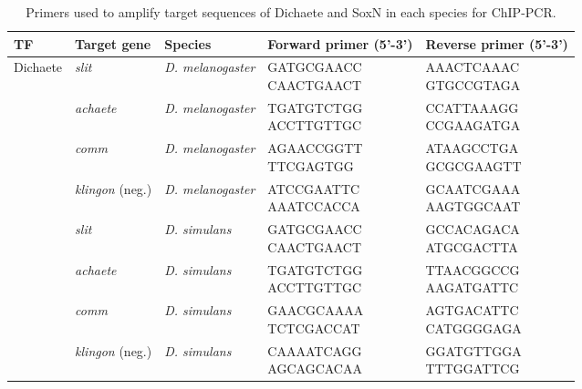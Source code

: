 \begin{center}
\begin{longtable}{|l|l|p{2.2cm}|p{3.3cm}|p{3.2cm}|}
\hline
\textbf{TF}       & \textbf{Target gene} & \textbf{Species}          & \textbf{Forward primer (5'-3')}       & \textbf{Reverse primer (5'-3')}       \\ \hline
\endfirsthead

\caption{Primers used to amplify target sequences of Dichaete and SoxN in each species for ChIP-PCR.}
\endlastfoot

Dichaete & \emph{slit}           & \emph{D. melanogaster}  & \parbox[t]{3cm}{GATGCGAACC\\ CAACTGAACT} & \parbox[t]{3cm}{AAACTCAAAC\\ GTGCCGTAGA} \\ \hline
         & \emph{achaete}        & \emph{D. melanogaster}  & \parbox[t]{3cm}{TGATGTCTGG\\ ACCTTGTTGC} & \parbox[t]{3cm}{CCATTAAAGG\\ CCGAAGATGA} \\ \hline
         & \emph{comm}           & \emph{D. melanogaster}  & \parbox[t]{3cm}{AGAACCGGTT\\ TTCGAGTGG}  & \parbox[t]{3cm}{ATAAGCCTGA\\ GCGCGAAGTT} \\ \hline
         & \emph{klingon} (neg.) & \emph{D. melanogaster}  & \parbox[t]{3cm}{ATCCGAATTC\\ AAATCCACCA} & \parbox[t]{3cm}{GCAATCGAAA\\ AAGTGGCAAT} \\ \hline
         & \emph{slit}           & \emph{D. simulans}      & \parbox[t]{3cm}{GATGCGAACC\\ CAACTGAACT} & \parbox[t]{3cm}{GCCACAGACA\\ ATGCGACTTA} \\ \hline
         & \emph{achaete}        & \emph{D. simulans}      & \parbox[t]{3cm}{TGATGTCTGG\\ ACCTTGTTGC} & \parbox[t]{3cm}{TTAACGGCCG\\ AAGATGATTC} \\ \hline
         & \emph{comm}           & \emph{D. simulans}      & \parbox[t]{3cm}{GAACGCAAAA\\ TCTCGACCAT} & \parbox[t]{3cm}{AGTGACATTC\\ CATGGGGAGA} \\ \hline
         & \emph{klingon} (neg.) & \emph{D. simulans}      & \parbox[t]{3cm}{CAAAATCAGG\\ AGCAGCACAA} & \parbox[t]{3cm}{GGATGTTGGA\\ TTTGGATTCG} \\ \hline

\end{longtable}
\end{center}
